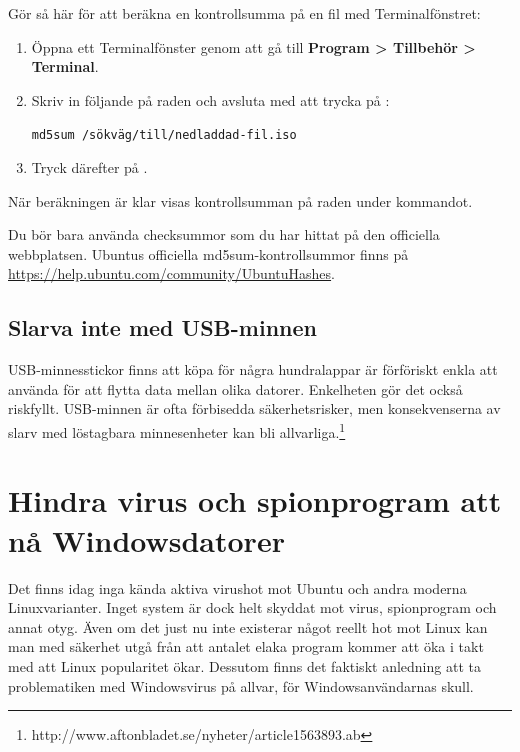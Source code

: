 \documentclass[a4paper,final]{memoir} %
\begin{document}
Gör så här för att beräkna en kontrollsumma på en fil med Terminalfönstret:

\begin{enumerate}

\item Öppna ett Terminalfönster genom att gå till \textbf{Program \textgreater{} Tillbehör \textgreater{} Terminal}.

\item Skriv in följande på raden och avsluta med att trycka på :

\texttt{md5sum /sökväg/till/nedladdad-fil.iso}

\item Tryck därefter på . 

\end{enumerate}

När beräkningen är klar visas kontrollsumman på raden under kommandot. 

Du bör bara använda checksummor som du har hittat på den officiella webbplatsen. Ubuntus officiella md5sum-kontrollsummor finns på \url{https://help.ubuntu.com/community/UbuntuHashes}.



\subsection{Slarva inte med USB-minnen}

USB-minnesstickor finns att köpa för några hundralappar är förföriskt enkla att använda för att flytta data mellan olika datorer. Enkelheten gör det också riskfyllt. USB-minnen är ofta förbisedda säkerhetsrisker, men konsekvenserna av slarv med löstagbara minnesenheter kan bli allvarliga.\footnote{http://www.aftonbladet.se/nyheter/article1563893.ab}

\section{Hindra virus och spionprogram att nå Windowsdatorer}

Det finns idag inga kända aktiva virushot mot Ubuntu och andra moderna Linuxvarianter. Inget system är dock helt skyddat mot virus, spionprogram och annat otyg. Även om det just nu inte existerar något reellt hot mot Linux kan man med säkerhet utgå från att antalet elaka program kommer att öka i takt med att Linux popularitet ökar.  Dessutom finns det faktiskt anledning att ta problematiken med Windowsvirus på allvar, för Windowsanvändarnas skull. 
\end{document}
